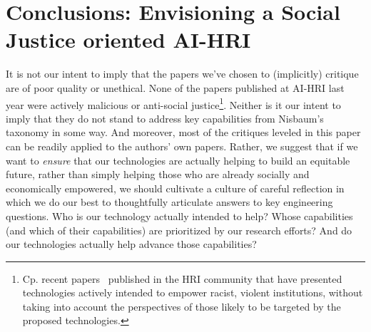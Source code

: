 \documentclass[letterpaper]{article} %
\begin{document}


\section{Conclusions: Envisioning a Social Justice oriented AI-HRI}

It is not our intent to imply that the papers we've chosen to (implicitly) critique are of poor quality or unethical. 
None of the papers published at AI-HRI last year were actively malicious or anti-social justice\footnote{Cp. recent papers~\cite{bordbar2021roman} published in the HRI community that have presented technologies actively intended to empower racist, violent institutions, without taking into account the perspectives of those likely to be targeted by the proposed technologies.}. Neither is it our intent to imply that they do not stand to address key capabilities from Nisbaum's taxonomy in some way. 
And moreover, most of the critiques leveled in this paper can be readily applied to the authors' own papers. 
Rather, we suggest that if we want to \textit{ensure} that our technologies are actually helping to build an equitable future, rather than simply helping those who are already socially and economically empowered, we should cultivate a culture of careful reflection in which we do our best to thoughtfully articulate answers to key engineering questions. Who is our technology actually intended to help? Whose capabilities (and which of their capabilities) are prioritized by our research efforts? And do our technologies actually help advance those capabilities?
\end{document}
